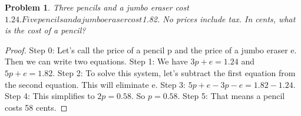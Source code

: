 \documentclass{article}
\newtheorem{theorem}{Problem}
\begin{document}
\begin{theorem}
Three pencils and a jumbo eraser cost $1.24. Five pencils and a jumbo eraser cost $1.82. No prices include tax. In cents, what is the cost of a pencil?
\end{theorem}

\begin{proof}
Step 0: Let's call the price of a pencil p and the price of a jumbo eraser e. Then we can write two equations.
Step 1: We have $3p+e=1.24$ and $5p+e=1.82$.
Step 2: To solve this system, let's subtract the first equation from the second equation. This will eliminate e.
Step 3: $5p+e-3p-e=1.82-1.24$.
Step 4: This simplifies to $2p=0.58$. So $p=0.58$.
Step 5: That means a pencil costs 58 cents.
\end{proof}
\end{document}

